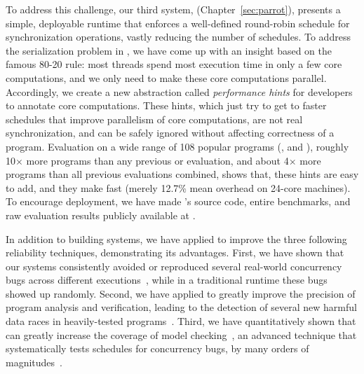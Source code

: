 To address this challenge, our third \smt system, \parrot 
(Chapter~\ref{sec:parrot}), presents a simple, deployable runtime that enforces 
a well-defined round-robin schedule for synchronization operations, vastly 
reducing the number of schedules. To address the serialization problem in \smt, 
we have come up with an insight based on the famous 80-20 rule: most threads 
spend most execution time in only a few core computations, and we only need to make 
these core computations parallel. Accordingly, we create a new abstraction 
called \emph{performance hints} for developers to annotate core computations. 
These hints, which just try to get to faster schedules that improve parallelism 
of core computations, are not real synchronization, and can be safely ignored 
without affecting correctness of a program. Evaluation on a wide range of 108 
popular programs (\eg, \bdb and \mplayer), roughly 10$\times$ more programs 
than any previous \smt or \dmt evaluation, and about 4$\times$ more programs 
than all previous evaluations combined, shows that, these hints are easy to 
add, and they make \parrot fast (merely 12.7\% mean overhead on 24-core machines). 
To encourage \smt deployment, we have made \parrot's source code, entire 
benchmarks, and raw evaluation results publicly available at \github.

In addition to building \smt systems, we have applied \smt to 
improve the three following reliability techniques, demonstrating its advantages. First, 
we have shown that our \smt systems consistently avoided or reproduced several 
real-world concurrency bugs across different executions~\cite{cui:tern:osdi10, 
peregrine:sosp11}, while in a traditional \pthread runtime these bugs
showed up randomly. Second, we have applied \smt to greatly improve the 
precision of program analysis and verification, leading to the detection of 
several new harmful data races in heavily-tested programs~\cite{wu:pldi12}. 
Third, we have quantitatively shown that \smt can greatly increase the 
coverage of model checking~\cite{demeter:sosp11, dbug:spin11, modist:nsdi09}, 
an advanced technique that systematically tests schedules for concurrency bugs, 
by many orders of magnitudes~\cite{parrot:sosp13}.


